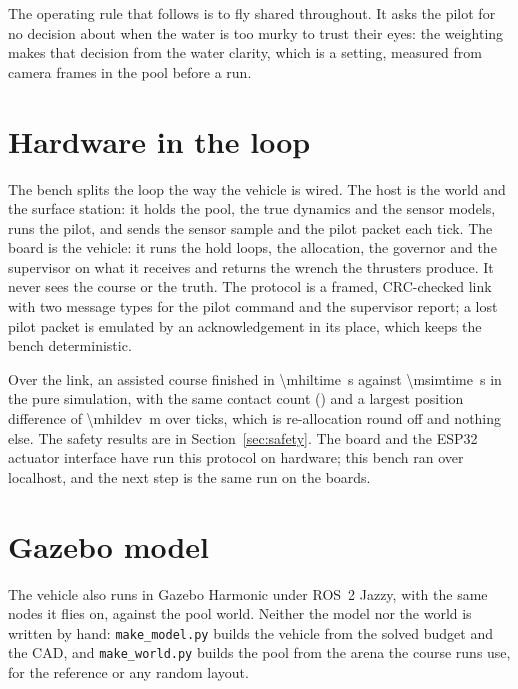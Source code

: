\documentclass[10pt,a4paper]{article}
\begin{document}
The operating rule that follows is to fly shared throughout. It asks the pilot
for no decision about when the water is too murky to trust their eyes: the
weighting makes that decision from the water clarity, which is a setting,
measured from camera frames in the pool before a run.

\section{Hardware in the loop}\label{sec:hil}

The bench splits the loop the way the vehicle is wired. The host is the world
and the surface station: it holds the pool, the true dynamics and the sensor
models, runs the pilot, and sends the sensor sample and the pilot packet each
tick. The board is the vehicle: it runs the hold loops, the allocation, the
governor and the supervisor on what it receives and returns the wrench the
thrusters produce. It never sees the course or the truth. The protocol is
a framed, CRC-checked link with two message types for the pilot
command and the supervisor report; a lost pilot packet is emulated by an
acknowledgement in its place, which keeps the bench deterministic.

Over the link, an assisted course finished in \SI{\mhiltime}{\second} against
\SI{\msimtime}{\second} in the pure simulation, with the same contact count
(\mhilcontacts) and a largest position difference of
\SI{\mhildev}{\metre} over \mhilticks{} ticks, which is re-allocation round
off and nothing else. The safety results are in Section~\ref{sec:safety}.
The board and the ESP32 actuator interface have run this protocol on
hardware; this bench ran over localhost, and the next step is the same run on
the boards.

\section{Gazebo model}\label{sec:gazebo}

The vehicle also runs in Gazebo Harmonic under ROS~2 Jazzy, with the same
nodes it flies on, against the pool world. Neither the model nor the world is
written by hand: \texttt{make\_model.py} builds the vehicle from the solved
budget and the CAD, and \texttt{make\_world.py} builds the pool from the arena
the course runs use, for the reference or any random layout.
\end{document}
